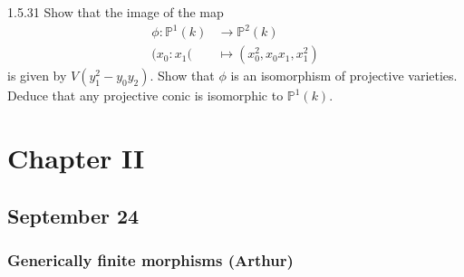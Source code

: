 \begin{manualexercise}{1.5.31}
	Show that the image of the map
	\begin{align*}
		\phi: \mathbb{P}^{1}(k) &\longrightarrow \mathbb{P}^{2}(k) \\
		(x_0:x_1( &\longmapsto (x_0^{2},x_0x_1,x_1^{2})
	\end{align*}
	is given by $V(y_1^{2}-y_0y_2)$. Show that $\phi$ is an isomorphism of projective varieties. Deduce that any projective conic is isomorphic to $\mathbb{P}^{1}(k)$.
\end{manualexercise}
\fi
\section{Chapter  II}

\subsection{September 24}

\subsubsection{Generically finite morphisms (Arthur)}

\begin{manualexercise}{2.37}
	
\end{manualexercise}

